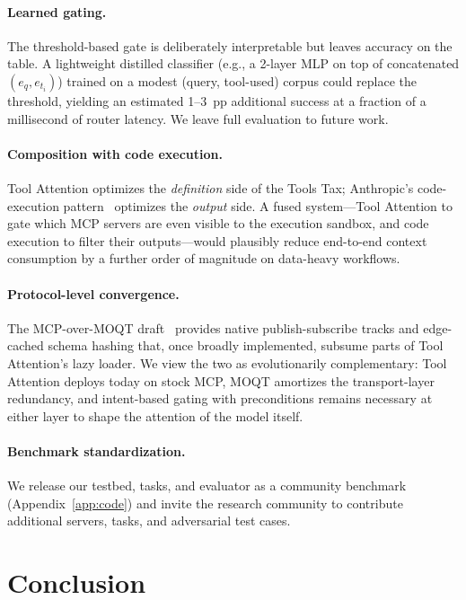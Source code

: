 \documentclass[11pt]{article}
\begin{document}
\paragraph{Learned gating.} The threshold-based gate is deliberately interpretable but leaves accuracy on the table. A lightweight distilled classifier (e.g., a 2-layer MLP on top of concatenated $(e_q, e_{t_i})$) trained on a modest (query, tool-used) corpus could replace the threshold, yielding an estimated 1--3~pp additional success at a fraction of a millisecond of router latency. We leave full evaluation to future work.

\paragraph{Composition with code execution.} Tool Attention optimizes the \emph{definition} side of the Tools Tax; Anthropic's code-execution pattern~\citep{kaplan2025codeexec} optimizes the \emph{output} side. A fused system---Tool Attention to gate which MCP servers are even visible to the execution sandbox, and code execution to filter their outputs---would plausibly reduce end-to-end context consumption by a further order of magnitude on data-heavy workflows.

\paragraph{Protocol-level convergence.} The MCP-over-MOQT draft~\citep{jennings2025moqt,jennings2025aimcp} provides native publish-subscribe tracks and edge-cached schema hashing that, once broadly implemented, subsume parts of Tool Attention's lazy loader. We view the two as evolutionarily complementary: Tool Attention deploys today on stock MCP, MOQT amortizes the transport-layer redundancy, and intent-based gating with preconditions remains necessary at either layer to shape the attention of the model itself.

\paragraph{Benchmark standardization.} We release our testbed, tasks, and evaluator as a community benchmark (Appendix~\ref{app:code}) and invite the research community to contribute additional servers, tasks, and adversarial test cases.

\section{Conclusion}\label{sec:conclusion}
\end{document}
